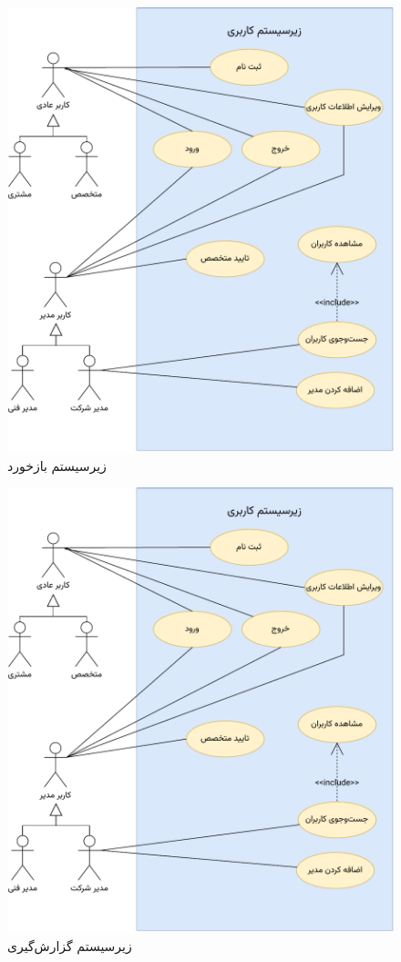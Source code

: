 \begin{figure}
\centering
	\includegraphics[scale=0.9, page=3]{figs/usecase.pdf}
\caption{زیرسیستم بازخورد}
\end{figure}
\FloatBarrier
\newpage

\begin{figure}
\centering
	\includegraphics[scale=0.9, page=4]{figs/usecase.pdf}
\caption{زیرسیستم گزارش‌گیری}
\end{figure}
\FloatBarrier
\newpage

